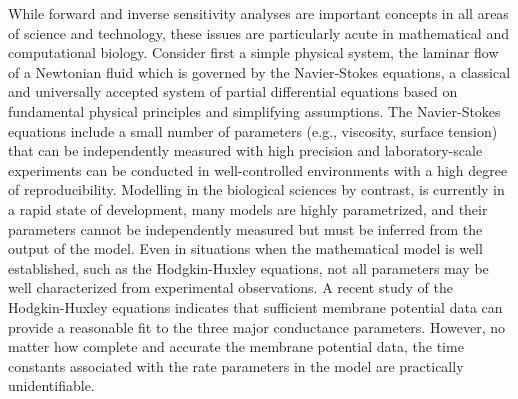 \documentclass[10pt,letterpaper]{article}
\begin{document}
While forward and inverse sensitivity analyses are important concepts in all areas of science and technology, these issues are particularly acute in mathematical and computational biology. Consider first a simple physical system, the laminar flow of a Newtonian fluid which is governed by the Navier-Stokes equations, a classical and universally accepted system of partial differential equations based on fundamental physical principles and simplifying assumptions. The Navier-Stokes equations include a small number of parameters (e.g., viscosity, surface tension) that can be independently measured with high precision and laboratory-scale experiments can be conducted in well-controlled environments with a high degree of reproducibility. Modelling in the biological sciences by contrast, is currently in a rapid state of development, many models are highly parametrized, and their parameters cannot be independently measured but must be inferred from the output of the model. Even in situations when the mathematical model is well established, such as the Hodgkin-Huxley equations, not all parameters may be well characterized from experimental observations. A recent study of the Hodgkin-Huxley equations \cite{DGHC-2018} indicates that sufficient membrane potential data can provide a reasonable fit to the three major conductance parameters. However, no matter how complete and accurate the membrane potential data, the time constants associated with the rate parameters in the model are practically unidentifiable. 
\end{document}
